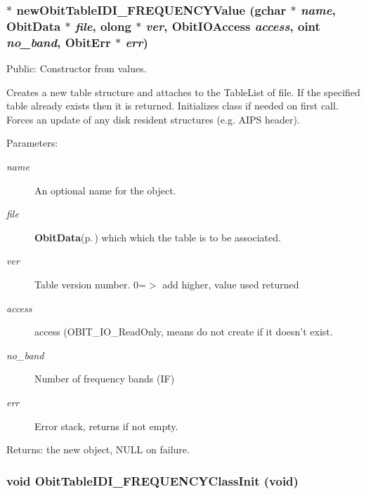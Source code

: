 \subsubsection{$\ast$ new\-Obit\-Table\-IDI\_\-FREQUENCYValue (gchar $\ast$ {\em name}, {\bf Obit\-Data} $\ast$ {\em file}, {\bf olong} $\ast$ {\em ver}, Obit\-IOAccess {\em access}, {\bf oint} {\em no\_\-band}, {\bf Obit\-Err} $\ast$ {\em err})}\label{ObitTableIDI__FREQUENCY_8h_a12}


Public: Constructor from values. 

Creates a new table structure and attaches to the Table\-List of file. If the specified table already exists then it is returned. Initializes class if needed on first call. Forces an update of any disk resident structures (e.g. AIPS header). \begin{Desc}
\item[Parameters:]
\begin{description}
\item[{\em name}]An optional name for the object. \item[{\em file}]{\bf Obit\-Data}{\rm (p.\,\pageref{structObitData})} which which the table is to be associated. \item[{\em ver}]Table version number. 0=$>$ add higher, value used returned \item[{\em access}]access (OBIT\_\-IO\_\-Read\-Only, means do not create if it doesn't exist. \item[{\em no\_\-band}]Number of frequency bands (IF) \item[{\em err}]Error stack, returns if not empty. \end{description}
\end{Desc}
\begin{Desc}
\item[Returns:]the new object, NULL on failure. \end{Desc}
\subsubsection{\setlength{\rightskip}{0pt plus 5cm}void Obit\-Table\-IDI\_\-FREQUENCYClass\-Init (void)}\label{ObitTableIDI__FREQUENCY_8h_a10}


